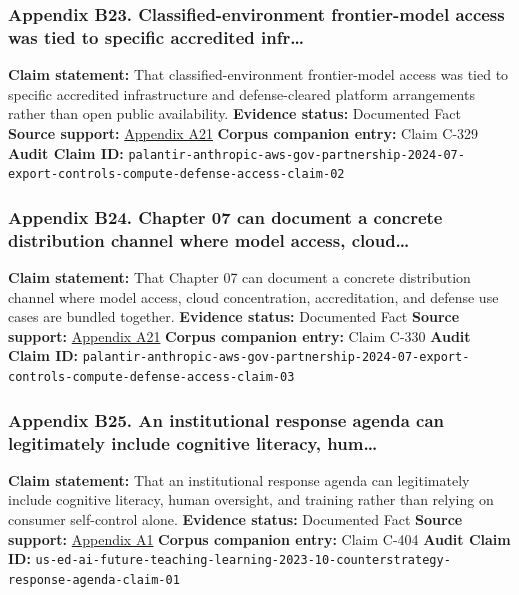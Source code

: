 \documentclass[
  american,
  11pt,
  letterpaper,
]{article}
\begin{document}
\subsubsection{Appendix B23. Classified-environment frontier-model
access was tied to specific accredited
infr\ldots{}}\label{appendix-b23-classified-environment-frontier-model-access-was-tied-to-specific-accredited-infr}

\textbf{Claim statement:} That classified-environment frontier-model
access was tied to specific accredited infrastructure and
defense-cleared platform arrangements rather than open public
availability. \textbf{Evidence status:} Documented Fact \textbf{Source
support:}
\hyperref[appendix-a21-anthropic-and-palantir-partner-to-bring-claude-ai-models-to-aws-for-u-s-government-intelligence-and-defense-operations]{Appendix
A21} \textbf{Corpus companion entry:} Claim C-329 \textbf{Audit Claim
ID:}
\texttt{palantir-anthropic-aws-gov-partnership-2024-07-export-controls-compute-defense-access-claim-02}

\subsubsection{Appendix B24. Chapter 07 can document a concrete
distribution channel where model access,
cloud\ldots{}}\label{appendix-b24-chapter-07-can-document-a-concrete-distribution-channel-where-model-access-cloud}

\textbf{Claim statement:} That Chapter 07 can document a concrete
distribution channel where model access, cloud concentration,
accreditation, and defense use cases are bundled together.
\textbf{Evidence status:} Documented Fact \textbf{Source support:}
\hyperref[appendix-a21-anthropic-and-palantir-partner-to-bring-claude-ai-models-to-aws-for-u-s-government-intelligence-and-defense-operations]{Appendix
A21} \textbf{Corpus companion entry:} Claim C-330 \textbf{Audit Claim
ID:}
\texttt{palantir-anthropic-aws-gov-partnership-2024-07-export-controls-compute-defense-access-claim-03}

\subsubsection{Appendix B25. An institutional response agenda can
legitimately include cognitive literacy,
hum\ldots{}}\label{appendix-b25-an-institutional-response-agenda-can-legitimately-include-cognitive-literacy-hum}

\textbf{Claim statement:} That an institutional response agenda can
legitimately include cognitive literacy, human oversight, and training
rather than relying on consumer self-control alone. \textbf{Evidence
status:} Documented Fact \textbf{Source support:}
\hyperref[appendix-a1-artificial-intelligence-and-the-future-of-teaching-and-learning-insights-and-recommendations]{Appendix
A1} \textbf{Corpus companion entry:} Claim C-404 \textbf{Audit Claim
ID:}
\texttt{us-ed-ai-future-teaching-learning-2023-10-counterstrategy-response-agenda-claim-01}
\end{document}

